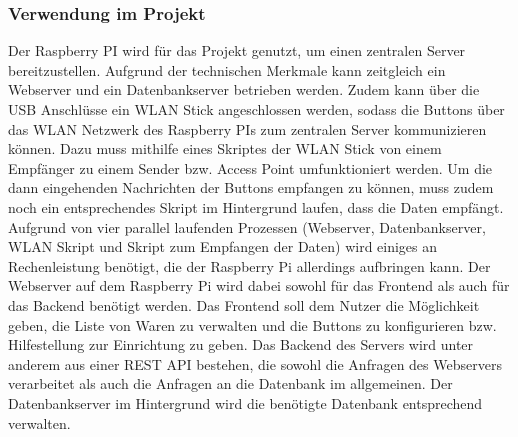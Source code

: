 \subsubsection{Verwendung im Projekt}        
\label{sec:Verwendung des Raspberry PI-1} 
Der Raspberry PI wird für das Projekt genutzt, um einen zentralen Server bereitzustellen. Aufgrund der technischen Merkmale kann zeitgleich ein Webserver und ein Datenbankserver betrieben werden. Zudem kann über die USB Anschlüsse ein WLAN Stick angeschlossen werden, sodass die Buttons über das WLAN Netzwerk des Raspberry PIs zum zentralen Server kommunizieren können. Dazu muss mithilfe eines Skriptes der WLAN Stick von einem Empfänger zu einem Sender bzw. Access Point umfunktioniert werden. Um die dann eingehenden Nachrichten der Buttons empfangen zu können, muss zudem noch ein entsprechendes Skript im Hintergrund laufen, dass die Daten empfängt. Aufgrund von vier parallel laufenden Prozessen (Webserver, Datenbankserver, WLAN Skript und Skript zum Empfangen der Daten) wird einiges an Rechenleistung benötigt, die der Raspberry Pi allerdings aufbringen kann. 
Der Webserver auf dem Raspberry Pi wird dabei sowohl für das Frontend als auch für das Backend benötigt werden. Das Frontend soll dem Nutzer die Möglichkeit geben, die Liste von Waren zu verwalten und die Buttons zu konfigurieren bzw. Hilfestellung zur Einrichtung zu geben. Das Backend des Servers wird unter anderem aus einer REST API bestehen, die sowohl die Anfragen des Webservers verarbeitet als auch die Anfragen an die Datenbank im allgemeinen. 
Der Datenbankserver im Hintergrund wird die benötigte Datenbank entsprechend verwalten. 